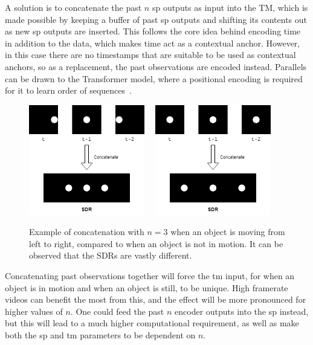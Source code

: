 A solution is to concatenate the past $n$ \gls*{sp} outputs as input into the TM, which is made possible by keeping a buffer of past \gls*{sp} outputs and shifting its contents out as new \gls*{sp} outputs are inserted. This follows the core idea behind encoding time in addition to the data, which makes time act as a contextual anchor. However, in this case there are no timestamps that are suitable to be used as contextual anchors, so as a replacement, the past observations are encoded instead. Parallels can be drawn to the Transformer model, where a positional encoding is required for it to learn order of sequences~\cite{transformer}.
\par
\begin{figure}[H]
    \centering
    \includegraphics[width=0.45\textwidth]{resources/methodology/temporal_concatenation.png}
    \unskip\ \vrule\
    \includegraphics[width=0.45\textwidth]{resources/methodology/temporal_concatenation_still.png}
    \caption[Multistep Temporal Pattern Example]{Example of concatenation with $n=3$ when an object is moving from left to right, compared to when an object is not in motion. It can be observed that the SDRs are vastly different.}
\end{figure}
Concatenating past observations together will force the \gls*{tm} input, for when an object is in motion and when an object is still, to be unique. High framerate videos can benefit the most from this, and the effect will be more pronounced for higher values of $n$. One could feed the past $n$ encoder outputs into the \gls*{sp} instead, but this will lead to a much higher computational requirement, as well as make both the \gls*{sp} and \gls*{tm} parameters to be dependent on $n$.

